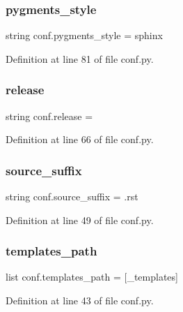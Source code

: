 \subsubsection{\texorpdfstring{pygments\+\_\+style}{pygments\_style}}
{\footnotesize\ttfamily string conf.\+pygments\+\_\+style = \textquotesingle{}sphinx\textquotesingle{}}



Definition at line 81 of file conf.\+py.

\mbox{\label{namespaceconf_a325dc746d8bf05c54d26351c35a21d90}} 
\subsubsection{\texorpdfstring{release}{release}}
{\footnotesize\ttfamily string conf.\+release = \textquotesingle{}\textquotesingle{}}



Definition at line 66 of file conf.\+py.

\mbox{\label{namespaceconf_a10af2a769eb3bd3322e874f677e435b1}} 
\subsubsection{\texorpdfstring{source\+\_\+suffix}{source\_suffix}}
{\footnotesize\ttfamily string conf.\+source\+\_\+suffix = \textquotesingle{}.rst\textquotesingle{}}



Definition at line 49 of file conf.\+py.

\mbox{\label{namespaceconf_ae850ae634911b713e036b43894fdd525}} 
\subsubsection{\texorpdfstring{templates\+\_\+path}{templates\_path}}
{\footnotesize\ttfamily list conf.\+templates\+\_\+path = \mbox{[}\textquotesingle{}\+\_\+templates\textquotesingle{}\mbox{]}}



Definition at line 43 of file conf.\+py.

